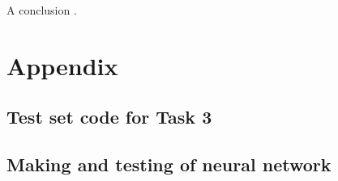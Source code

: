 \documentclass[a4paper, 10pt, conference]{ieeeconf}
\begin{document}
A conclusion \cite{pca}. 




\onecolumn
\section{Appendix} \label{sec:appendix}

\subsection*{Test set code for Task 3}

\newpage

\subsection*{Making and testing of neural network}

\newpage
\end{document}
